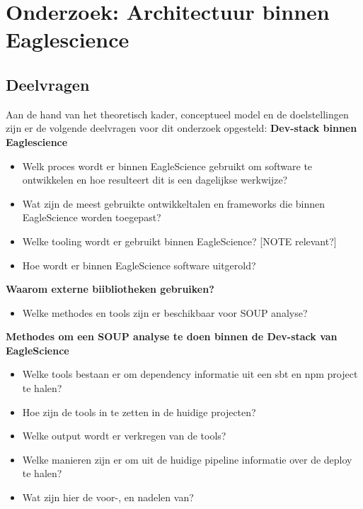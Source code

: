 \chapter{Onderzoek: Architectuur binnen Eaglescience}\label{ch:onderzoek:-architectuur-binnen-eaglescience}



\section{Deelvragen}\label{sec:deelvragen}
Aan de hand van het theoretisch kader, conceptueel model en de doelstellingen zijn er de volgende deelvragen voor dit onderzoek opgesteld:
\textbf{Dev-stack binnen Eaglescience}
\begin{itemize}
    \item Welk proces wordt er binnen EagleScience gebruikt om software te ontwikkelen en hoe resulteert dit is een dagelijkse werkwijze?
    \item Wat zijn de meest gebruikte ontwikkeltalen en frameworks die binnen EagleScience worden toegepast?
    \item Welke tooling wordt er gebruikt binnen EagleScience? [NOTE relevant?]
    \item Hoe wordt er binnen EagleScience software uitgerold?
\end{itemize}
\textbf{Waarom externe biibliotheken gebruiken?}
\begin{itemize}
    \item Welke methodes en tools zijn er beschikbaar voor SOUP analyse?
\end{itemize}
\textbf{Methodes om een SOUP analyse te doen binnen de Dev-stack van EagleScience}
\begin{itemize}
    \item Welke tools bestaan er om dependency informatie uit een sbt en npm project te halen?
    \item Hoe zijn de tools in te zetten in de huidige projecten?
    \item Welke output wordt er verkregen van de tools?
    \item Welke manieren zijn er om uit de huidige pipeline informatie over de deploy te halen?
    \item Wat zijn hier de voor-, en nadelen van?
\end{itemize}




